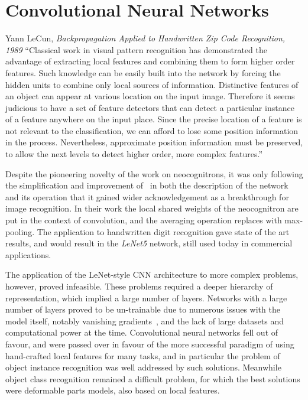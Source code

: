 \documentclass[thesis]{subfiles}
\begin{document}
	\section{Convolutional Neural Networks}
	\begin{chapquote}{Yann LeCun, \textit{Backpropagation Applied to Handwritten Zip Code Recognition, 1989}}
		``Classical work in visual pattern recognition has demonstrated the advantage of extracting local features and combining them to form higher order features. Such knowledge can be easily built into the network by forcing the hidden units to combine only local sources of information. Distinctive features of an object can appear at various location on the input image. Therefore it seems judicious to have a set of feature detectors that can detect a particular instance of a feature anywhere on the input place. Since the precise location of a feature is not relevant to the classification, we can afford to lose some position information in the process. Nevertheless, approximate position information must be preserved, to allow the next levels to detect higher order, more complex features.''
	\end{chapquote}
	
	Despite the pioneering novelty of the work on neocognitrons, it was only following the simplification and improvement of~\citet{lecun1989backpropagation,Lecun1998} in both the description of the network and its operation that it gained wider acknowledgement as a breakthrough for image recognition. In their work the local shared weights of the neocognitron are put in the context of convolution, and the averaging operation replaces with max-pooling. The application to handwritten digit recognition gave state of the art results, and would result in the \emph{LeNet5} network, still used today in commercial applications.
	
	The application of the LeNet-style CNN architecture to more complex problems, however, proved infeasible. These problems required a deeper hierarchy of representation, which implied a large number of layers. Networks with a large number of layers proved to be un-trainable due to numerous issues with the model itself, notably vanishing gradients~\citep{hochreiter1991untersuchungen}, and the lack of large datasets and computational power at the time. Convolutional neural networks fell out of favour, and were passed over in favour of the more successful paradigm of using hand-crafted local features for many tasks, and in particular the problem of object instance recognition was well addressed by such solutions. Meanwhile object class recognition remained a difficult problem, for which the best solutions were deformable parts models, also based on local features.
	
\end{document}
